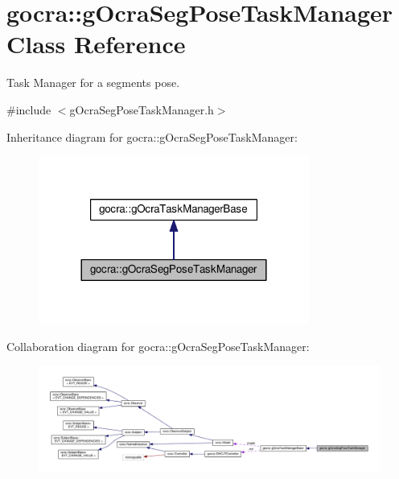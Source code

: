 \hypertarget{classgocra_1_1gOcraSegPoseTaskManager}{}\section{gocra\+:\+:g\+Ocra\+Seg\+Pose\+Task\+Manager Class Reference}
\label{classgocra_1_1gOcraSegPoseTaskManager}


Task Manager for a segment\textquotesingle{}s pose.  




{\ttfamily \#include $<$g\+Ocra\+Seg\+Pose\+Task\+Manager.\+h$>$}



Inheritance diagram for gocra\+:\+:g\+Ocra\+Seg\+Pose\+Task\+Manager\+:
\nopagebreak
\begin{figure}[H]
\begin{center}
\leavevmode
\includegraphics[width=252pt]{da/df2/classgocra_1_1gOcraSegPoseTaskManager__inherit__graph}
\end{center}
\end{figure}


Collaboration diagram for gocra\+:\+:g\+Ocra\+Seg\+Pose\+Task\+Manager\+:
\nopagebreak
\begin{figure}[H]
\begin{center}
\leavevmode
\includegraphics[width=350pt]{d2/ddc/classgocra_1_1gOcraSegPoseTaskManager__coll__graph}
\end{center}
\end{figure}

